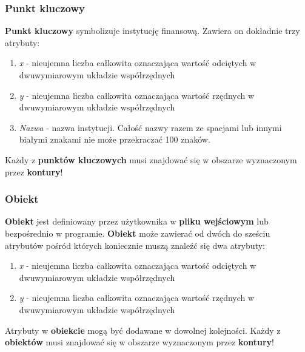 \documentclass[a4paper, 10pt, titlepage]{article}
\begin{document}
\subsubsection{Punkt kluczowy}
\textbf{Punkt kluczowy} symbolizuje instytucję finansową. 
Zawiera on dokładnie trzy atrybuty:
\begin{enumerate}
\item \textit{x} - nieujemna liczba całkowita oznaczająca wartość odciętych w dwuwymiarowym układzie współrzędnych
\item \textit{y} - nieujemna liczba całkowita oznaczająca wartość rzędnych w dwuwymiarowym układzie współrzędnych
\item \textit{Nazwa} - nazwa instytucji. Całość nazwy razem ze spacjami lub innymi białymi znakami nie może przekraczać 100 znaków. 
\end{enumerate}
Każdy z \textbf{punktów kluczowych} musi znajdować się w obszarze wyznaczonym przez \textbf{kontury}!

\subsubsection{Obiekt}
\textbf{Obiekt} jest definiowany przez użytkownika w \textbf{pliku wejściowym} lub bezpośrednio w programie. 
\textbf{Obiekt} może zawierać od dwóch do sześciu atrybutów pośród których koniecznie muszą znaleźć się dwa atrybuty:
\begin{enumerate}
\item \textit{x} - nieujemna liczba całkowita oznaczająca wartość odciętych w dwuwymiarowym układzie współrzędnych
\item \textit{y} - nieujemna liczba całkowita oznaczająca wartość rzędnych w dwuwymiarowym układzie współrzędnych
\end{enumerate}
Atrybuty w \textbf{obiekcie} mogą być dodawane w dowolnej kolejności.
Każdy z \textbf{obiektów} musi znajdować się w obszarze wyznaczonym przez \textbf{kontury}!
\end{document}
